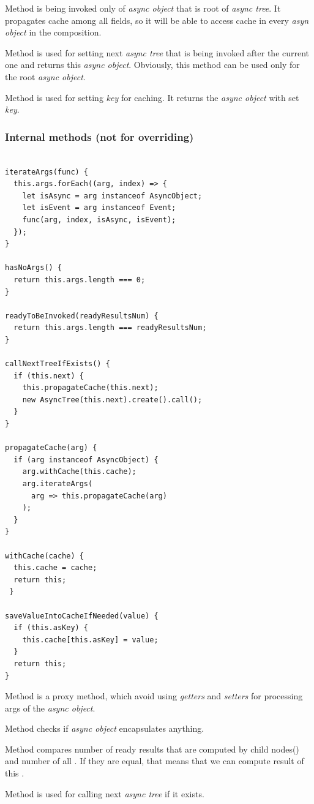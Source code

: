 \documentclass{article}
\newcommand{\cit}[1]{{\fontfamily{qcr}\selectfont{\textit{\textcolor{superdarkgray}{#1}}}}}
\begin{document}
Method \cit{call} is being invoked only of \textit{async object} that is root of \textit{async tree}. It propagates cache among all fields, so it will be able to access cache in every \textit{asyn object} in the composition.

Method \cit{after} is used for setting next \textit{async tree} that is being invoked after the current one and returns this \textit{async object}. Obviously, this method can be used only for the root \textit{async object}.

Method \cit{as} is used for setting \textit{key} for caching. It returns the \textit{async object} with set \textit{key}.

\vspace*{10px}

\subsubsection{Internal methods (not for overriding)}

\begin{lstlisting}

iterateArgs(func) {
  this.args.forEach((arg, index) => {
    let isAsync = arg instanceof AsyncObject;
    let isEvent = arg instanceof Event;
    func(arg, index, isAsync, isEvent);
  });
}

hasNoArgs() {
  return this.args.length === 0;
}

readyToBeInvoked(readyResultsNum) {
  return this.args.length === readyResultsNum;
}

callNextTreeIfExists() {
  if (this.next) {
    this.propagateCache(this.next);
    new AsyncTree(this.next).create().call();
  }
}

propagateCache(arg) {
  if (arg instanceof AsyncObject) {
    arg.withCache(this.cache);
    arg.iterateArgs(
      arg => this.propagateCache(arg)
    );
  }
}

withCache(cache) {
  this.cache = cache;
  return this;
 }
 
saveValueIntoCacheIfNeeded(value) {
  if (this.asKey) {
    this.cache[this.asKey] = value;
  }
  return this;
}

\end{lstlisting}

Method \cit{iterateArgs} is a proxy method, which avoid using \textit{getters} and \textit{setters} for processing args of the \textit{async object}.

Method \cit{hasNoArgs} checks if \textit{async object} encapsulates anything.

Method \cit{readyToBeInvoked} compares number of ready results that are computed by child nodes(\cit{...args}) and number of all \cit{..args}. If they are equal, that means that we can compute result of this \cit{async object}.

Method \cit{callNextTreeIfExists} is used for calling next \textit{async tree} if it exists.
\end{document}
